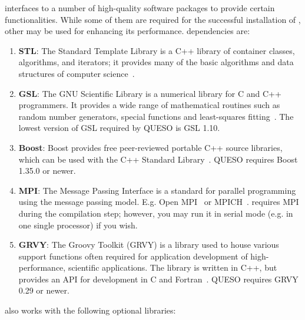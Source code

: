 \Queso{} interfaces to a number of high-quality software packages to provide certain functionalities. While some of them are required for the successful installation of \Queso{}, other may be used for enhancing its performance. 
%
\Queso{} dependencies are:
\begin{enumerate}%

  \item \textbf{STL}: The Standard Template Library is a C++ library of container classes, algorithms, and iterators; it provides many of the basic algorithms and data structures of computer science~\cite{STL}.

  \item \textbf{GSL}: The GNU Scientific Library is a numerical library for C and C++ programmers. It provides a wide range of mathematical routines such as random number generators, special functions and least-squares fitting~\cite{Gsl}. The lowest version of GSL required by QUESO is GSL 1.10.

  \item \textbf{Boost}: Boost provides free peer-reviewed portable C++ source libraries, which can be used with the C++ Standard Library~\cite{Boost}. QUESO requires Boost 1.35.0 or newer.

  \item \textbf{MPI}: The Message Passing Interface is a standard for parallel programming using the message passing model. E.g. Open MPI~\cite{Openmpi} or MPICH~\cite{Mpich}. \Queso{} requires MPI during the compilation step; however, you may run it in serial mode (e.g. in one single processor) if you wish. 

  \item \textbf{GRVY}: The Groovy Toolkit (GRVY) is a library used to house various support functions often required for application development of high-performance, scientific applications. The library is written in C++, but provides an API for development in C and Fortran~\cite{grvy}. QUESO requires GRVY 0.29 or newer.

\end{enumerate}%

\Queso{} also works with the following optional libraries:


